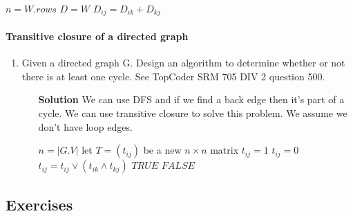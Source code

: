 \documentclass{book}
\begin{document}
		\begin{algorithm*}[h!]
			\begin{algorithmic}[1]
					\State $n = W.rows$
					\State $D = W$
									\State $D_{ij} = D_{ik} + D_{kj}$
								\EndIf
							\EndFor
						\EndFor
					\EndFor
				\EndFunction
			\end{algorithmic}
		\end{algorithm*}
		\FloatBarrier	
	
	\paragraph{Transitive closure of a directed graph}
	\begin{enumerate}
		\item Given a directed graph G. Design an algorithm to determine whether or not there is at least one cycle. See TopCoder SRM 705 DIV 2 question 500.
		\begin{itemize}
			\item[\textbf{Solution}] We can use DFS and if we find a back edge then it's part of a cycle. We can use transitive closure to solve this problem. We assume we don't have loop edges.
			\begin{algorithm*}[h!]
				\begin{algorithmic}
						\State $n = |G.V|$
						\State let $T = (t_{ij})$ be a new $n \times n$ matrix
									\State $t_{ij} = 1$
								\Else
									\State $t_{ij} = 0$								
								\EndIf
							\EndFor
						\EndFor
									\State $t_{ij} = t_{ij} \lor (t_{ik} \land t_{kj})$
								\EndFor
							\EndFor
						\EndFor
								\State \Return $TRUE$
							\EndIf
						\EndFor
						\State \Return $FALSE$
					\EndFunction
				\end{algorithmic}
			\end{algorithm*}
		\end{itemize}
	\end{enumerate}

	\subsection{Exercises}
\end{document}
